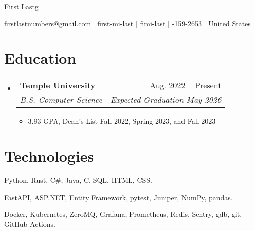 \documentclass[letterpaper,11pt]{article}
\makeatletter
\newcommand{\resumeSubheading}[4]{%
  \item
    \begin{tabular*}{0.97\textwidth}[t]{l@{\extracolsep{\fill}}r}
      \textbf{#1} & #2 \\
      \textit{\small#3} & \textit{\small #4} \\
    \end{tabular*}\vspace{-7pt}
}
\newcommand{\resumeSubheadingListStart}{\begin{itemize}[leftmargin=0.15in, label={}]}
\newcommand{\resumeSubheadingListEnd}{\end{itemize}}
\newcommand{\resumeItemListStart}{\begin{itemize}}
\newcommand{\resumeItemListEnd}{\end{itemize}}
\newcommand{\myemail}{firstlastnumbers@gmail.com}
\newcommand{\myname}{First Lastg}
\newcommand{\mygh}{first-mi-last}
\newcommand{\mylinkedin}{fimi-last}
\newcommand{\myphone}{314-159-2653}
\newcommand{\mylocation}{United States}
\newcommand{\myemail}{jonathanzhang929@gmail.com}
\newcommand{\myname}{Jonathan Zhang}
\newcommand{\mygh}{jonathan-d-zhang}
\newcommand{\mylinkedin}{jd-zhang}
\newcommand{\myphone}{484-986-8012}
\newcommand{\mylocation}{Philadelphia, PA}
\makeatother
\begin{document}
{\Huge \myname}
\\
\vspace{2pt}

\small{
    \faEnvelope
    \thinspace \thinspace
    \myemail
    \thinspace \thinspace $|$
    \faGithub
    \thinspace \thinspace
    \mygh
    \thinspace \thinspace $|$
    \faLinkedin
    \thinspace \thinspace
    \mylinkedin
    \thinspace \thinspace $|$
    \faPhone
    \thinspace \thinspace
    \myphone
    \thinspace \thinspace $|$
    \thinspace \thinspace
    \mylocation
}

\vspace{-8pt}

\section{Education}
  \resumeSubheadingListStart
    \resumeSubheading{Temple University}{Aug. 2022 -- Present}{B.S. Computer Science}{Expected Graduation May 2026}
    \resumeItemListStart
        \item 3.93 GPA, Dean's List Fall 2022, Spring 2023, and Fall 2023
    \resumeItemListEnd
  \resumeSubheadingListEnd

\section{Technologies}
\begin{description}[nosep, left=0.15in]
    \item[Programming Languages:]
        Python,
        Rust,
        C\#,
        Java,
        C,
        SQL,
        HTML,
        CSS.
    \item[Libraries:]
        FastAPI,
        ASP.NET,
        Entity Framework,
        pytest,
        Juniper,
        NumPy,
        pandas.
    \item[Tools:]
        Docker,
        Kubernetes,
        ZeroMQ,
        Grafana,
        Prometheus,
        Redis,
        Sentry,
        gdb,
        git,
        GitHub Actions.
\end{description}
\end{document}
